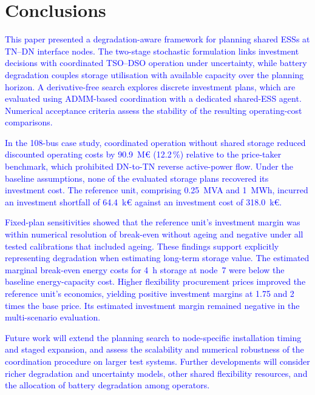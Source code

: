 \documentclass[preprint,12pt]{elsarticle}
\begin{document}
\section{Conclusions}
\label{sec:conclusions}

\textcolor{blue}{
    This paper presented a degradation-aware framework for planning shared ESSs at TN--DN interface nodes. The two-stage stochastic formulation links investment decisions with coordinated TSO--DSO operation under uncertainty, while battery degradation couples storage utilisation with available capacity over the planning horizon. A derivative-free search explores discrete investment plans, which are evaluated using ADMM-based coordination with a dedicated shared-ESS agent. Numerical acceptance criteria assess the stability of the resulting operating-cost comparisons.
}

\textcolor{blue}{
    In the 108-bus case study, coordinated operation without shared storage reduced discounted operating costs by 90.9~M\euro{} (12.2\,\%) relative to the price-taker benchmark, which prohibited DN-to-TN reverse active-power flow. Under the baseline assumptions, none of the evaluated storage plans recovered its investment cost. The reference unit, comprising 0.25~MVA and 1~MWh, incurred an investment shortfall of 64.4~k\euro{} against an investment cost of 318.0~k\euro{}.
}

\textcolor{blue}{
    Fixed-plan sensitivities showed that the reference unit's investment margin was within numerical resolution of break-even without ageing and negative under all tested calibrations that included ageing. These findings support explicitly representing degradation when estimating long-term storage value. The estimated marginal break-even energy costs for 4~h storage at node~7 were below the baseline energy-capacity cost. Higher flexibility procurement prices improved the reference unit's economics, yielding positive investment margins at 1.75 and 2 times the base price. Its estimated investment margin remained negative in the multi-scenario evaluation.
}

\textcolor{blue}{
    Future work will extend the planning search to node-specific installation timing and staged expansion, and assess the scalability and numerical robustness of the coordination procedure on larger test systems. Further developments will consider richer degradation and uncertainty models, other shared flexibility resources, and the allocation of battery degradation among operators.
}
\end{document}
